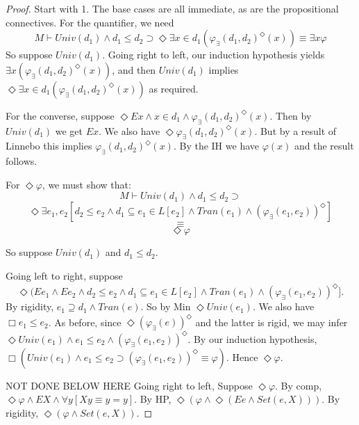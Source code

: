 \documentclass{article}
\begin{document}
    \begin{proof}
        Start with 1.
        The base cases are all immediate, as are the propositional connectives. 
        For the quantifier, we need 
        $$M \vdash Univ(d_1) \wedge d_1 \leq d_2 \supset 
        \Diamond \exists x \in d_1(\varphi_\exists(d_1, d_2)^\Diamond(x)) 
        \equiv 
        \exists x \varphi$$
        So suppose $Univ(d_1)$. Going right to left, our induction hypothesis 
        yields $\exists x (\varphi_\exists(d_1, d_2)^\Diamond(x))$, 
        and then $Univ(d_1)$ 
        implies $\Diamond \exists x \in d_1 (\varphi_\exists(d_1, d_2)^\Diamond(x))$ as 
        required. 
    
        For the converse, suppose 
        $\Diamond Ex \wedge x \in d_1 \wedge \varphi_\exists(d_1, d_2)^\Diamond(x)$.
        Then by $Univ(d_1)$ we get $Ex$. 
        We also have $\Diamond \varphi_\exists(d_1, d_2)^\Diamond(x)$.
        But by a result of Linnebo this implies $\varphi_\exists(d_1, d_2)^\Diamond(x)$.
        By the IH we have $\varphi(x)$ and the result follows.
    
        For $\Diamond \varphi$, we must show that:
        $$M \vdash Univ(d_1) \wedge d_1 \leq d_2 \supset $$
        $$\Diamond \exists e_1, e_2[d_2 \leq e_2 \wedge d_1 \subseteq e_1 \in L[e_2] \wedge Tran(e_1) \wedge (\varphi_\exists(e_1, e_2))^\Diamond]$$
        $$\equiv $$
        $$\Diamond \varphi$$
    
        So suppose $Univ(d_1)$ and $d_1 \leq d_2$. 
        
        Going left to right, suppose
        $$\Diamond (Ee_1 \wedge Ee_2  \wedge d_2 \leq e_2 \wedge d_1 \subseteq e_1 \in L[e_2] \wedge Tran(e_1) \wedge (\varphi_\exists(e_1, e_2))^\Diamond].$$
        By rigidity, $e_1 \supseteq d_1 \wedge Tran(e)$. 
        So by Min $\Diamond Univ(e_1)$. We also have \\ $\Box e_1 \leq e_2$.
        As before, since
        $\Diamond (\varphi_\exists(e))^\Diamond$ and the latter is rigid, we may infer 
        $\Diamond Univ(e_1) \wedge e_1 \leq e_2 \wedge (\varphi_\exists(e_1, e_2))^\Diamond$.
        By our induction hypothesis, 
        $\Box (Univ(e_1) \wedge e_1 \leq e_2 \supset (\varphi_\exists(e_1, e_2))^\Diamond \equiv \varphi)$.
        Hence $\Diamond \varphi$. 
        
        NOT DONE BELOW HERE
        Going right to left,
        Suppose $\Diamond \varphi$. By comp, 
        $\Diamond \varphi \wedge EX \wedge \forall y[Xy \equiv y = y]$.
        By HP, 
        $\Diamond (\varphi \wedge \Diamond (Ee \wedge Set(e, X)))$.
        By rigidity, $\Diamond (\varphi \wedge Set(e, X))$.
    

\end{proof}
\end{document}
